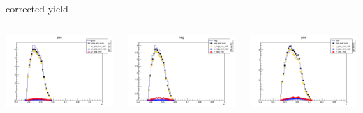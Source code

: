 \begin{frame}{corrected yield}
\begin{columns}
\begin{column}[T]{0.25\textwidth}
\includegraphics[width = \textwidth]{results/yield/statistics_corr/yield_x_Q2_z_0.55_5.500_0.45_pos.png}
\end{column}
\begin{column}[T]{0.25\textwidth}
\includegraphics[width = \textwidth]{results/yield/statistics_corr/yield_x_Q2_z_0.55_5.500_0.45_neg.png}
\end{column}
\begin{column}[T]{0.25\textwidth}
\includegraphics[width = \textwidth]{results/yield/statistics_corr/yield_x_Q2_z_0.55_5.500_0.55_pos.png}

\end{column}
\end{columns}
\end{frame}

